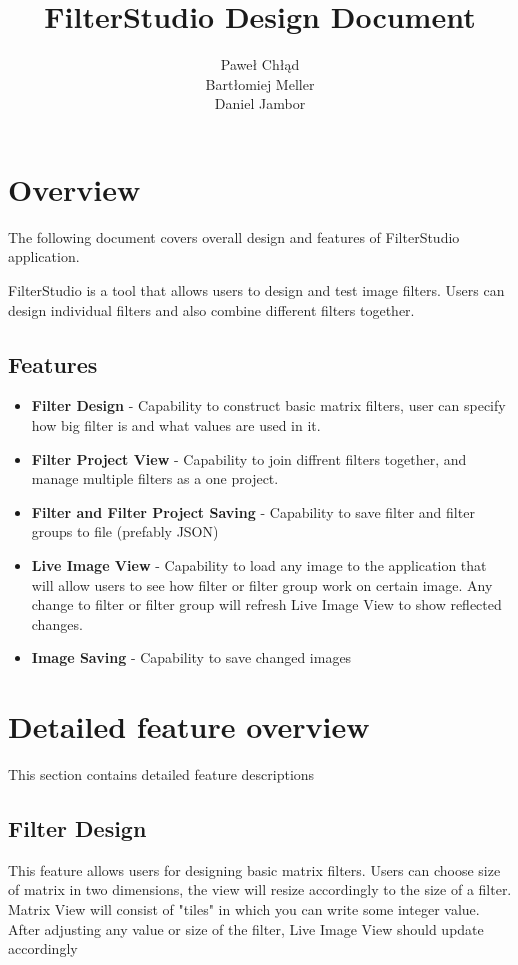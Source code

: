 \documentclass{article}
\title{FilterStudio Design Document}
\author{Paweł Chłąd \\ Bartłomiej Meller \\ Daniel Jambor }
\begin{document}
\maketitle
\pagebreak


\section{Overview}

The following document covers overall design and features of FilterStudio application.

FilterStudio is a tool that allows users to design and test image filters. Users can 
design individual filters and also combine different filters together. 


\subsection{Features}


\begin{itemize}
\item \textbf{Filter Design} - Capability to construct basic matrix filters, user can specify
how big filter is and what values are used in it.

\item \textbf{Filter Project View} - Capability to join diffrent filters together, and manage
multiple filters as a one project.

\item \textbf{Filter and Filter Project Saving} - Capability to save filter and filter groups to file (prefably JSON)
\item \textbf{Live Image View} - Capability to load any image to the application that will allow users to see
how filter or filter group work on certain image. Any change to filter or filter group will refresh Live Image View to show
reflected changes.
\item \textbf{Image Saving} - Capability to save changed images 
\end{itemize}


\section{Detailed feature overview}
This section contains detailed feature descriptions

\subsection{Filter Design}
This feature allows users for designing basic matrix filters. Users can choose size of matrix in two dimensions, the view will resize accordingly to the size of a filter. Matrix View will consist of "tiles" in which you can write some integer value. After adjusting any value or size of the filter, Live Image View should update accordingly
\end{document}
